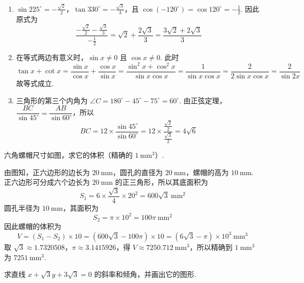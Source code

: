 \begin{solution}
\begin{enumerate}
\item \(\sin225^\circ=-\frac{\sqrt{2}}{2}\)，\(\tan330^\circ=-\frac{\sqrt{3}}{3}\)，且
\(\cos(-120^\circ)=\cos120^\circ=-\frac{1}{2}\).
因此原式为
\[
\frac{-\frac{\sqrt{2}}{2}-\frac{\sqrt{3}}{3}}{-\frac{1}{2}}
=\sqrt{2}+\frac{2\sqrt{3}}{3}
=\frac{3\sqrt{2}+2\sqrt{3}}{3}
\]

\item 在等式两边有意义时，\(\sin x\ne0\) 且 \(\cos x\ne0\). 此时
\[
\tan x+\cot x
=\frac{\sin x}{\cos x}+\frac{\cos x}{\sin x}
=\frac{\sin^2x+\cos^2x}{\sin x\cos x}
=\frac{1}{\sin x\cos x}
=\frac{2}{2\sin x\cos x}
=\frac{2}{\sin2x}
\]
故等式成立.

\item 三角形的第三个内角为 \(\angle C=180^\circ-45^\circ-75^\circ=60^\circ\).
由正弦定理，
\(\dfrac{BC}{\sin45^\circ}=\dfrac{AB}{\sin60^\circ}\)，所以
\[
BC=12\times\frac{\sin45^\circ}{\sin60^\circ}
=12\times\frac{\frac{\sqrt{2}}{2}}{\frac{\sqrt{3}}{2}}
=4\sqrt{6}
\]
\end{enumerate}
\end{solution}

\begin{problem}
六角螺帽尺寸如图，求它的体积（精确的 \(1 \mathrm{~mm}^3\)）.

\begin{center}
\end{center}
\end{problem}

\begin{solution}
由图知，正六边形的边长为 \(20 \mathrm{~mm}\)，圆孔的直径为 \(20 \mathrm{~mm}\)，螺帽的高为 \(10 \mathrm{~mm}\).
正六边形可分成六个边长为 \(20 \mathrm{~mm}\) 的正三角形，所以其底面积为
\[
S_1=6\times\frac{\sqrt{3}}{4}\times20^2=600\sqrt{3}\mathrm{~mm}^2
\]
圆孔半径为 \(10 \mathrm{~mm}\)，其面积为
\[
S_2=\pi\times10^2=100\pi\mathrm{~mm}^2
\]
因此螺帽的体积为
\[
V=(S_1-S_2)\times10
=(600\sqrt{3}-100\pi)\times10
=(6\sqrt{3}-\pi)\times10^3\mathrm{~mm}^3
\]
取 \(\sqrt{3}\approx1.7320508\)，\(\pi\approx3.1415926\)，得
\(V\approx7250.712\mathrm{~mm}^3\)，所以精确到 \(1 \mathrm{~mm}^3\) 为 \(7251 \mathrm{~mm}^3\).
\end{solution}

\begin{problem}
求直线 \(x+\sqrt{3}y+3\sqrt{3}=0\) 的斜率和倾角，并画出它的图形.
\end{problem}

